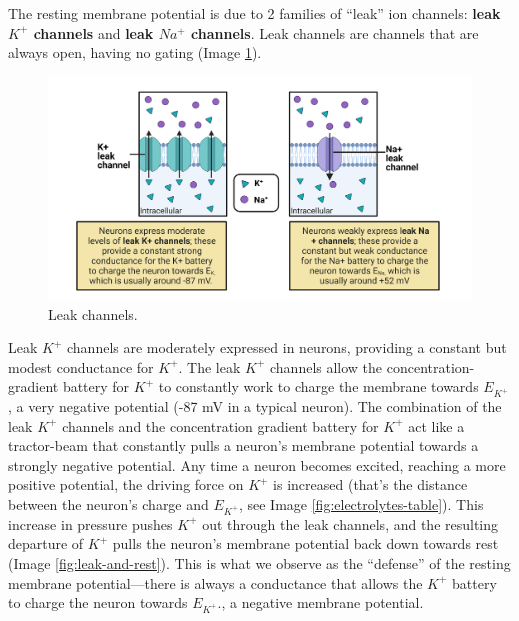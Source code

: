 \documentclass[
]{book}
\begin{document}
The resting membrane potential is due to 2 families of ``leak'' ion channels: \textbf{leak \(K^+\) channels} and \textbf{leak \(Na^+\) channels}. Leak channels are channels that are always open, having no gating (Image \ref{fig:leak-channels}).

\begin{figure}

{\centering \includegraphics[width=0.9\linewidth]{images/ch02/02_19} 

}

\caption{Leak channels.}\label{fig:leak-channels}
\end{figure}

Leak \(K^+\) channels are moderately expressed in neurons, providing a constant but modest conductance for \(K^+\). The leak \(K^+\) channels allow the concentration-gradient battery for \(K^+\) to constantly work to charge the membrane towards \(E_{K^+}\), a very negative potential (-87 mV in a typical neuron). The combination of the leak \(K^+\) channels and the concentration gradient battery for \(K^+\) act like a tractor-beam that constantly pulls a neuron's membrane potential towards a strongly negative potential. Any time a neuron becomes excited, reaching a more positive potential, the driving force on \(K^+\) is increased (that's the distance between the neuron's charge and \(E_{K^+}\), see Image \ref{fig:electrolytes-table}). This increase in pressure pushes \(K^+\) out through the leak channels, and the resulting departure of \(K^+\) pulls the neuron's membrane potential back down towards rest (Image \ref{fig:leak-and-rest}). This is what we observe as the ``defense'' of the resting membrane potential---there is always a conductance that allows the \(K^+\) battery to charge the neuron towards \(E_{K^+}\)., a negative membrane potential.
\end{document}
